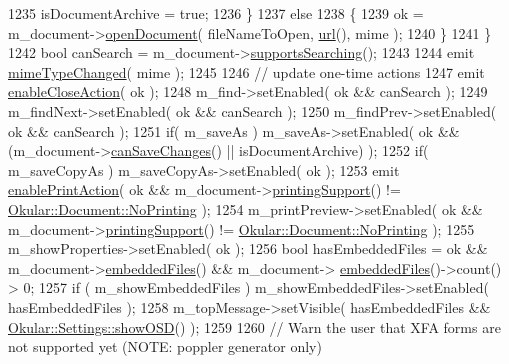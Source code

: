\begin{DoxyCode}
1235             isDocumentArchive = \textcolor{keyword}{true};
1236         \}
1237         \textcolor{keywordflow}{else}
1238         \{
1239             ok = m\_document->\hyperlink{classOkular_1_1Document_aaec42a1303846888ea6d3151d2be2c3e}{openDocument}( fileNameToOpen, \hyperlink{classKParts_1_1ReadOnlyPart_aba05c3b2fd42dcfebc6585e4f746d2cb}{url}(), mime );
1240         \}
1241     \}
1242     \textcolor{keywordtype}{bool} canSearch = m\_document->\hyperlink{classOkular_1_1Document_acadcf633db6332012dbbd1914fddd0c9}{supportsSearching}();
1243 
1244     emit \hyperlink{classOkular_1_1Part_a65d7234673882ed0e6d6d26c189be043}{mimeTypeChanged}( mime );
1245 
1246     \textcolor{comment}{// update one-time actions}
1247     emit \hyperlink{classOkular_1_1Part_a7cdc8bd152358129c9033f8ae57ac022}{enableCloseAction}( ok );
1248     m\_find->setEnabled( ok && canSearch );
1249     m\_findNext->setEnabled( ok && canSearch );
1250     m\_findPrev->setEnabled( ok && canSearch );
1251     \textcolor{keywordflow}{if}( m\_saveAs ) m\_saveAs->setEnabled( ok && (m\_document->\hyperlink{classOkular_1_1Document_a46772ecd6dc23f6e07fb358eef32924d}{canSaveChanges}() || 
      isDocumentArchive) );
1252     \textcolor{keywordflow}{if}( m\_saveCopyAs ) m\_saveCopyAs->setEnabled( ok );
1253     emit \hyperlink{classOkular_1_1Part_a8b19626e9fcd036e065b71f8cc77d65e}{enablePrintAction}( ok && m\_document->\hyperlink{classOkular_1_1Document_ab126b62cb37b419a4d51b4c30729e85b}{printingSupport}() != 
      \hyperlink{classOkular_1_1Document_ad5630e57d57d854b37ed4b362f7dab12a81a8466201e7cb753617f7af99308ae7}{Okular::Document::NoPrinting} );
1254     m\_printPreview->setEnabled( ok && m\_document->\hyperlink{classOkular_1_1Document_ab126b62cb37b419a4d51b4c30729e85b}{printingSupport}() != 
      \hyperlink{classOkular_1_1Document_ad5630e57d57d854b37ed4b362f7dab12a81a8466201e7cb753617f7af99308ae7}{Okular::Document::NoPrinting} );
1255     m\_showProperties->setEnabled( ok );
1256     \textcolor{keywordtype}{bool} hasEmbeddedFiles = ok && m\_document->\hyperlink{classOkular_1_1Document_a0d0f25adc4dab338160d951a2fafd2d3}{embeddedFiles}() && m\_document->
      \hyperlink{classOkular_1_1Document_a0d0f25adc4dab338160d951a2fafd2d3}{embeddedFiles}()->count() > 0;
1257     \textcolor{keywordflow}{if} ( m\_showEmbeddedFiles ) m\_showEmbeddedFiles->setEnabled( hasEmbeddedFiles );
1258     m\_topMessage->setVisible( hasEmbeddedFiles && \hyperlink{classOkular_1_1Settings_ab6a3d4459b9ef5fa47cc7083968da797}{Okular::Settings::showOSD}() );
1259 
1260     \textcolor{comment}{// Warn the user that XFA forms are not supported yet (NOTE: poppler generator only)}

\end{DoxyCode}
